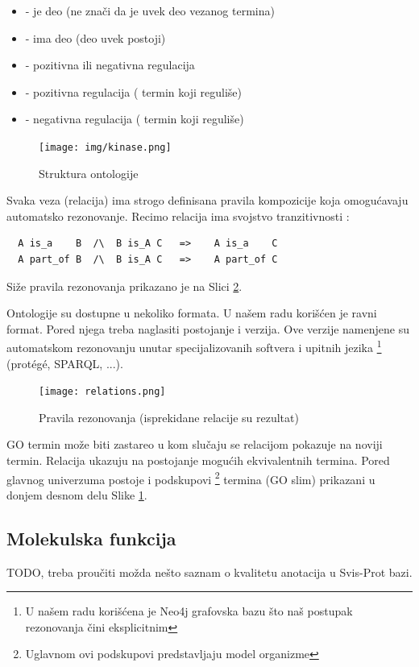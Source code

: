 \begin{itemize}
  \item {}  - je deo  (ne znači da je uvek deo vezanog termina)
  \item {} - ima deo (deo uvek postoji)
  \item {} - pozitivna ili negativna regulacija
  \item {} - pozitivna regulacija  
    ( termin koji reguliše)
  \item {} - negativna regulacija 
    ( termin koji reguliše)
\end{itemize}

\begin{figure}[h!]
  \centering
  \texttt{[image: img/kinase.png]}
  \caption{Struktura ontologije}
  \label{fig:kinase}
\end{figure}

Svaka veza (relacija) ima strogo definisana pravila kompozicije koja omogućavaju
automatsko rezonovanje. Recimo relacija  ima svojstvo
tranzitivnosti \parencite{is_a}:
\begin{verbatim}
  A is_a    B  /\  B is_A C   =>    A is_a    C           
  A part_of B  /\  B is_A C   =>    A part_of C
\end{verbatim}

Siže pravila rezonovanja prikazano je na Slici \ref{fig:relations}.

Ontologije su dostupne u nekoliko formata. U našem radu korišćen je ravni
 format.  Pored njega treba naglasiti postojanje  i
 verzija.  Ove verzije namenjene su automatskom rezonovanju unutar
specijalizovanih softvera i upitnih jezika \footnote{U našem radu korišćena je
Neo4j grafovska bazu što naš postupak rezonovanja čini eksplicitnim} (protégé,
SPARQL, ...).

\begin{figure}[h!]
  \centering
  \texttt{[image: relations.png]}
  \caption{Pravila rezonovanja (isprekidane relacije su rezultat)}
  \label{fig:relations}
\end{figure}

GO termin može biti zastareo u kom slučaju se relacijom 
pokazuje na noviji termin. Relacija  ukazuju na
postojanje mogućih ekvivalentnih termina. Pored glavnog univerzuma postoje i
podskupovi \footnote{Uglavnom ovi podskupovi predstavljaju model organizme}
termina (GO slim) prikazani u donjem desnom delu Slike \ref{fig:kinase}.


\subsection{Molekulska funkcija}
TODO, treba proučiti \parencite{go_mf} možda nešto saznam o kvalitetu anotacija
u Svis-Prot bazi.











